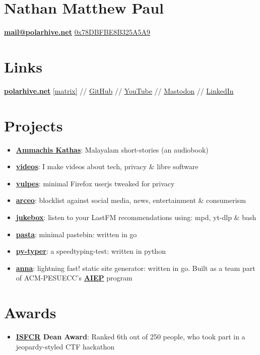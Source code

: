 \documentclass[letterpaper, 11pt]{article}
\newcommand{\resumeItem}[2]{
  \item\small{
    \textbf{#1}{: #2 \vspace{-2pt}}
  }
}
\newcommand{\resumeSubItem}[2]{\resumeItem{#1}{#2}\vspace{-4pt}}
\newcommand{\resumeSubHeadingListStart}{\begin{itemize}[leftmargin=*]}
\newcommand{\resumeSubHeadingListEnd}{\end{itemize}}
\begin{document}
\section{\Huge {\textbf {Nathan Matthew Paul}}}
{\textbf{\href{mailto:mail@polarhive.net}{mail@polarhive.net}}}
\newline
{\href{https://polarhive.net/.well-known/polarhive_gpg.txt}{0x78DBFBE8B325A5A9}}
\section{Links}
{\textbf{\href{https://polarhive.net}{polarhive.net}}
\newline
{\href{https://matrix.to/#/@polarhive:matrix.org}{[matrix]}} //
{\href{https://github.com/polarhive}{GitHub}} //
{\href{https://youtube.com/polarhive}{YouTube}} //
{\href{https://mastodon.social/@polarhive}{Mastodon}} //
{\href{https://www.linkedin.com/in/polarhive}{LinkedIn}}

\section{Projects}
  \resumeSubHeadingListStart
    \resumeSubItem{\href{https://polarhive.net/ammachiskathas}{Ammachis Kathas}}
      {Malayalam short-stories (an audiobook)}
    \resumeSubItem{\href{https://polarhive.net/videos}{videos}}
      {I make videos about tech, privacy \& libre software}
    \resumeSubItem{\href{https://polarhive.net/vulpes}{vulpes}}
      {minimal Firefox userjs tweaked for privacy}
    \resumeSubItem{\href{https://polarhive.net/arceo}{arceo}}
      {blocklist against social media, news, entertainment \& consumerism}
    \resumeSubItem{\href{https://polarhive.net/jukebox}{jukebox}}
      {listen to your LastFM recommendations using: mpd, yt-dlp \& bash}
    \resumeSubItem{\href{https://polarhive.net/pasta}{pasta}}
      {minimal pastebin: written in go}
    \resumeSubItem{\href{https://polarhive.net/py-typer}{py-typer}}
      {a speedtyping-test: written in python}
    \resumeSubItem{\href{https://github.com/acmpesuecc/anna}{anna}}
      {lightning fast! static site generator: written in go. Built as a team part of {ACM-PESUECC's} {\href{https://acmpesuecc.github.io/aiep}{\textbf{AIEP}}} program}
  \resumeSubHeadingListEnd

  \section{Awards}
  \resumeSubHeadingListStart
    \resumeSubItem{\href{https://isfcr.pes.edu}{ISFCR} Dean Award}
     {Ranked 6th out of 250 people, who took part in a jeopardy-styled CTF hackathon}
  \resumeSubHeadingListEnd

}
\end{document}
